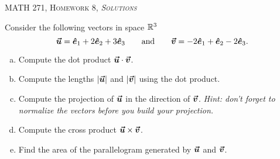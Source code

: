 \documentclass[12pt]{article} %
\newcommand{\ehat}{\boldsymbol{\hat{e}}}
\begin{document}
\begin{center}
   \textsc{\large MATH 271, Homework 8, \emph{Solutions}}\\
\end{center}
\vspace{.5cm}



\begin{problem}
Consider the following vectors in space $\mathbb{R}^3$
\[
\vecu = \ehat_1 + 2\ehat_2 + 3\ehat_3 \qquad \textrm{and} \qquad \vecv = -2\ehat_1 +\ehat_2 -2\ehat_3.
\]
\begin{enumerate}[(a)]
    \item Compute the dot product $\boldsymbol{\vec{u}}\cdot \boldsymbol{\vec{v}}$.
    \item Compute the lengths $|\boldsymbol{\vec{u}}|$ and $|\boldsymbol{\vec{v}}|$ using the dot product.
    \item Compute the projection of $\boldsymbol{\vec{u}}$ in the direction of $\boldsymbol{\vec{v}}$.
    \emph{Hint: don't forget to normalize the vectors before you build your projection.}
    \item Compute the cross product $\boldsymbol{\vec{u}} \times \boldsymbol{\vec{v}}$.
    \item Find the area of the parallelogram generated by $\boldsymbol{\vec{u}}$ and $\boldsymbol{\vec{v}}$.
\end{enumerate}
\end{problem}
\end{document}
